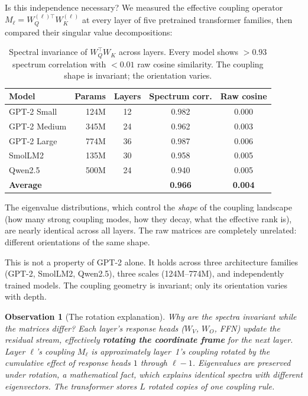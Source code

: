 \documentclass[11pt, a4paper]{article}
\theoremstyle{plain}
\newtheorem{observation}{Observation}
\theoremstyle{remark}
\begin{document}
Is this independence necessary?
We measured the effective coupling operator $M_\ell = W_Q^{(\ell)\top} W_K^{(\ell)}$ at every layer of five pretrained transformer families, then compared their singular value decompositions:

\begin{table}[h]
\centering\small
\begin{tabular}{@{}lrccc@{}}
\toprule
\textbf{Model} & \textbf{Params} & \textbf{Layers} & \textbf{Spectrum corr.} & \textbf{Raw cosine} \\
\midrule
GPT-2 Small & 124M & 12 & 0.982 & 0.000 \\
GPT-2 Medium & 345M & 24 & 0.962 & 0.003 \\
GPT-2 Large & 774M & 36 & 0.987 & 0.006 \\
SmolLM2 & 135M & 30 & 0.958 & 0.005 \\
Qwen2.5 & 500M & 24 & 0.940 & 0.005 \\
\midrule
\textbf{Average} & & & \textbf{0.966} & \textbf{0.004} \\
\bottomrule
\end{tabular}
\caption{Spectral invariance of $W_Q^\top W_K$ across layers. Every model shows $>0.93$ spectrum correlation with $<0.01$ raw cosine similarity. The coupling shape is invariant; the orientation varies.}
\label{tab:spectral}
\end{table}

The eigenvalue distributions, which control the \emph{shape} of the coupling landscape (how many strong coupling modes, how they decay, what the effective rank is), are nearly identical across all layers.
The raw matrices are completely unrelated: different orientations of the same shape.

This is not a property of GPT-2 alone.
It holds across three architecture families (GPT-2, SmolLM2, Qwen2.5), three scales (124M--774M), and independently trained models.
The coupling geometry is invariant; only its orientation varies with depth.

\begin{observation}[The rotation explanation]
Why are the spectra invariant while the matrices differ?
Each layer's response heads ($W_V$, $W_O$, FFN) update the residual stream, effectively \textbf{rotating the coordinate frame} for the next layer.
Layer $\ell$'s coupling $M_\ell$ is approximately layer~1's coupling \emph{rotated} by the cumulative effect of response heads $1$ through $\ell{-}1$.
Eigenvalues are preserved under rotation, a mathematical fact, which explains identical spectra with different eigenvectors.
The transformer stores $L$ rotated copies of one coupling rule.
\end{observation}
\end{document}

